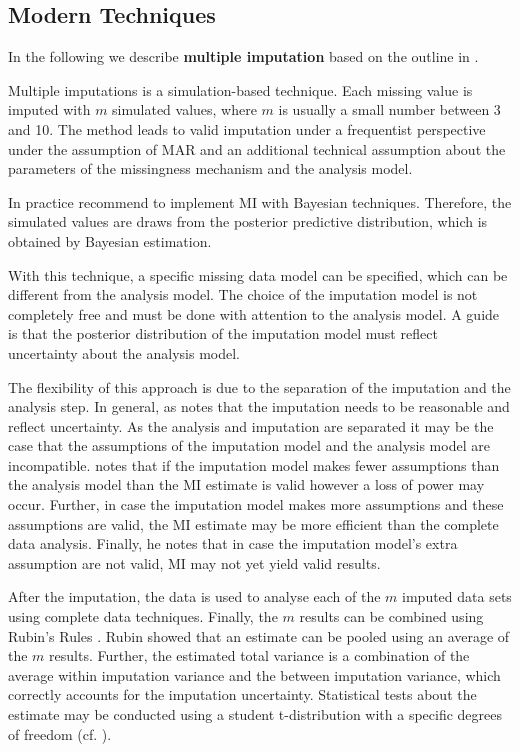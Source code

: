 \subsection{Modern Techniques} 
 In the following we describe \textbf{multiple imputation} based on the outline in \cite{Schafer99}. \par  
Multiple imputations is a simulation-based technique. Each missing value is imputed with $m$  simulated values, where $m$ is usually a small number between 3 and 10. The method leads to valid imputation under a frequentist perspective under the assumption of MAR and an additional technical assumption about the parameters of the missingness mechanism and the analysis model. \par 
In practice \cite{Little} recommend to implement MI with Bayesian techniques. Therefore, the simulated values are draws from the posterior predictive distribution, which is obtained by Bayesian estimation.  \par
With this technique, a specific missing data model can be specified, which can be different from the analysis model. The choice of the imputation model is not completely free and must be done with attention to the analysis model.  A guide is that the posterior distribution of the imputation model must reflect uncertainty about the analysis model. \par The flexibility of this approach is due to the separation of the imputation and the analysis step. In general, as \cite{Schafer99} notes that the imputation needs to be reasonable and reflect uncertainty. As the analysis and imputation are separated it may be the case that the assumptions of the imputation model and the analysis model are incompatible. \cite{Schafer99} notes that if the imputation model makes fewer assumptions than the analysis model than the MI estimate is valid however a loss of power may occur. Further, in case the imputation model makes more assumptions and these assumptions are valid, the MI estimate may be more efficient than the complete data analysis. Finally, he notes that in case the imputation model's extra assumption are not valid, MI may not yet yield valid results.  \par 
After the imputation, the data is used to analyse each of the $m$ imputed data sets using complete data techniques. Finally, the $m$ results can be combined using Rubin's Rules \cite{rubin1987multiple}.  Rubin showed that an estimate can be pooled using an average of the $m$ results. Further, the estimated total variance is a combination of the average within imputation variance and the between imputation variance, which correctly accounts for the imputation uncertainty. Statistical tests about the estimate may be conducted using a student t-distribution with a specific degrees of freedom (cf. \cite{Schafer99}).   \par 
